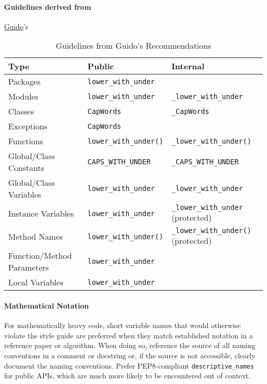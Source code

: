 \documentclass[
]{article}
\begin{document}
\paragraph{Guidelines derived from}
\href{https://en.wikipedia.org/wiki/Guido_van_Rossum}{Guido}'s
\begin{table}[h!]
  \centering
  \begin{tabular}{|>{\raggedright\arraybackslash}p{4cm}|>{\raggedright\arraybackslash}p{4cm}|>{\raggedright\arraybackslash}p{4cm}|}
  \hline
  \textbf{Type} & \textbf{Public} & \textbf{Internal} \\
  \hline
  Packages & \texttt{lower\_with\_under} &  \\
  \hline
  Modules & \texttt{lower\_with\_under} & \texttt{\_lower\_with\_under} \\
  \hline
  Classes & \texttt{CapWords} & \texttt{\_CapWords} \\
  \hline
  Exceptions & \texttt{CapWords} &  \\
  \hline
  Functions & \texttt{lower\_with\_under()} & \texttt{\_lower\_with\_under()} \\
  \hline
  Global/Class Constants & \texttt{CAPS\_WITH\_UNDER} & \texttt{\_CAPS\_WITH\_UNDER} \\
  \hline
  Global/Class Variables & \texttt{lower\_with\_under} & \texttt{\_lower\_with\_under} \\
  \hline
  Instance Variables & \texttt{lower\_with\_under} & \texttt{\_lower\_with\_under} (protected) \\
  \hline
  Method Names & \texttt{lower\_with\_under()} & \texttt{\_lower\_with\_under()} (protected) \\
  \hline
  Function/Method Parameters & \texttt{lower\_with\_under} &  \\
  \hline
  Local Variables & \texttt{lower\_with\_under} &  \\
  \hline
  \end{tabular}
  \caption{Guidelines from Guido's Recommendations}
  \label{tab:guidelines}
  \end{table}

\paragraph{Mathematical Notation}

For mathematically heavy code, short variable names that would otherwise
violate the style guide are preferred when they match established
notation in a reference paper or algorithm. When doing so, reference the
source of all naming conventions in a comment or docstring or, if the
source is not accessible, clearly document the naming conventions.
Prefer PEP8-compliant \texttt{descriptive\_names} for public APIs, which
are much more likely to be encountered out of context.
\end{document}
